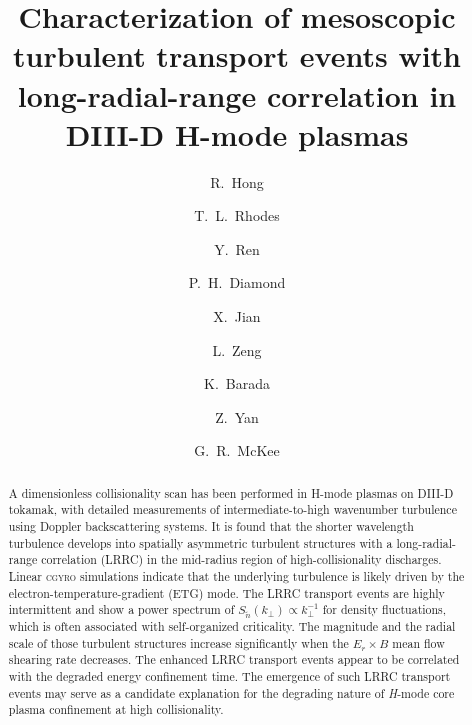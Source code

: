 \documentclass[english,aip,pop,superscriptaddress,preprint,letterpaper]{revtex4-2}
\begin{document}
\title{Characterization of mesoscopic turbulent transport events with long-radial-range correlation in DIII-D H-mode plasmas}
\author{R.~Hong}
\author{T.~L.~Rhodes}
\author{Y.~Ren}
\author{P.~H.~Diamond}
\author{X.~Jian}
\author{L.~Zeng}
\author{K.~Barada}
\author{Z.~Yan}
\author{G.~R.~McKee}

\begin{abstract}
A dimensionless collisionality scan has been performed in H-mode plasmas on DIII-D tokamak, with detailed measurements of intermediate-to-high wavenumber turbulence using Doppler backscattering systems.
It is found that the shorter wavelength turbulence develops into spatially asymmetric turbulent structures with a long-radial-range correlation (LRRC) in the mid-radius region of high-collisionality discharges. 
Linear \textsc{cgyro} simulations indicate that the underlying turbulence is likely driven by the electron-temperature-gradient (ETG) mode. 
The LRRC transport events are highly intermittent and show a power spectrum of \(S_{\tilde{n}}(k_\perp) \propto k^{-1}_\perp\) for density fluctuations, which is often associated with self-organized criticality.
The magnitude and the radial scale of those turbulent structures increase significantly when the $E_{r}\times B$ mean flow shearing rate decreases.
The enhanced LRRC transport events appear to be correlated with the degraded energy confinement time.
The emergence of such LRRC transport events may serve as a candidate explanation for the degrading nature of \emph{H}-mode core plasma confinement at high collisionality.
\end{abstract}

\maketitle
\end{document}
